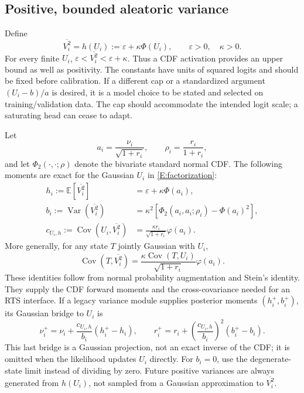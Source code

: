 \documentclass[letterpaper]{article}
\newcommand{\E}{\mathbb E}
\newcommand{\Var}{\operatorname{Var}}
\newcommand{\Cov}{\operatorname{Cov}}
\newcommand{\vbari}{\overline{V_i^2}}
\begin{document}
\subsection{Positive, bounded aleatoric variance}
Define
\begin{equation}
\boxed{\vbari=h(U_i):=\varepsilon+\kappa\Phi(U_i),\qquad \varepsilon>0,\quad\kappa>0.}
\label{E:head}
\end{equation}
For every finite $U_i$, $\varepsilon<\vbari<\varepsilon+\kappa$. Thus a CDF activation provides an upper bound as well as positivity. The constants have units of squared logits and should be fixed before calibration. If a different cap or a standardized argument $(U_i-b)/a$ is desired, it is a model choice to be stated and selected on training/validation data. The cap should accommodate the intended logit scale; a saturating head can cease to adapt.

Let
\begin{equation}
a_i=\frac{\nu_i}{\sqrt{1+r_i}},\qquad \rho_i=\frac{r_i}{1+r_i},
\end{equation}
and let $\Phi_2(\cdot,\cdot;\rho)$ denote the bivariate standard normal CDF. The following moments are exact for the Gaussian $U_i$ in \eqref{E:factorization}:
\begin{align}
h_i:=\E[\vbari]&=\varepsilon+\kappa\Phi(a_i),\label{E:hmean}\\
b_i:=\Var(\vbari)&=\kappa^2\left[\Phi_2(a_i,a_i;\rho_i)-\Phi(a_i)^2\right],\label{E:hvar}\\
c_{U_i,h}:=\Cov(U_i,\vbari)&=\frac{\kappa r_i}{\sqrt{1+r_i}}\varphi(a_i).\label{E:hc}
\end{align}
More generally, for any state $T$ jointly Gaussian with $U_i$,
\begin{equation}
\Cov(T,\vbari)=\frac{\kappa\Cov(T,U_i)}{\sqrt{1+r_i}}\varphi(a_i).
\label{E:upstreamcdf}
\end{equation}
These identities follow from normal probability augmentation and Stein's identity. They supply the CDF forward moments and the cross-covariance needed for an RTS interface. If a legacy variance module supplies posterior moments $(h_i^+,b_i^+)$, its Gaussian bridge to $U_i$ is
\begin{equation}
\nu_i^+=\nu_i+\frac{c_{U_i,h}}{b_i}(h_i^+-h_i),\qquad
r_i^+=r_i+\left(\frac{c_{U_i,h}}{b_i}\right)^2(b_i^+-b_i).
\label{E:cdfbridge}
\end{equation}
This last bridge is a Gaussian projection, not an exact inverse of the CDF; it is omitted when the likelihood updates $U_i$ directly. For $b_i=0$, use the degenerate-state limit instead of dividing by zero. Future positive variances are always generated from $h(U_i)$, not sampled from a Gaussian approximation to $\vbari$.
\end{document}
